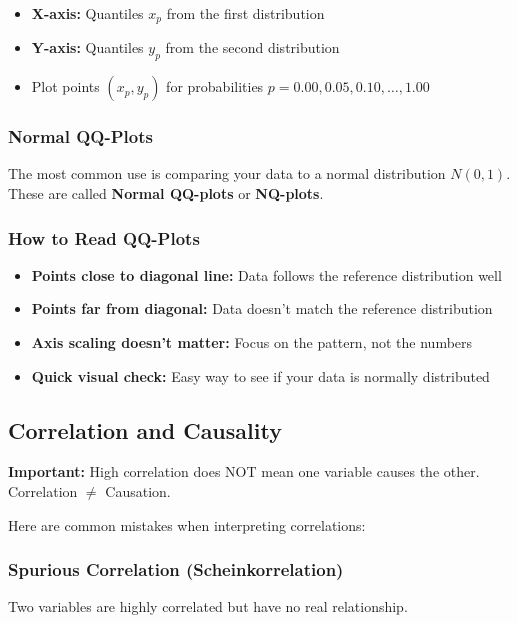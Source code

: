 \documentclass{article}
\begin{document}
\begin{itemize}
    \item \textbf{X-axis:} Quantiles $x_p$ from the first distribution
    \item \textbf{Y-axis:} Quantiles $y_p$ from the second distribution
    \item Plot points $(x_p, y_p)$ for probabilities $p = 0.00, 0.05, 0.10, \ldots, 1.00$
\end{itemize}

\subsubsection{Normal QQ-Plots}

The most common use is comparing your data to a normal distribution $N(0,1)$. These are called \textbf{Normal QQ-plots} or \textbf{NQ-plots}.

\subsubsection{How to Read QQ-Plots}

\begin{itemize}
    \item \textbf{Points close to diagonal line:} Data follows the reference distribution well
    \item \textbf{Points far from diagonal:} Data doesn't match the reference distribution
    \item \textbf{Axis scaling doesn't matter:} Focus on the pattern, not the numbers
    \item \textbf{Quick visual check:} Easy way to see if your data is normally distributed
\end{itemize}

\subsection{Correlation and Causality}

\textbf{Important:} High correlation does NOT mean one variable causes the other. Correlation $\neq$ Causation.

Here are common mistakes when interpreting correlations:

\subsubsection{Spurious Correlation (Scheinkorrelation)}

Two variables are highly correlated but have no real relationship.
\end{document}
